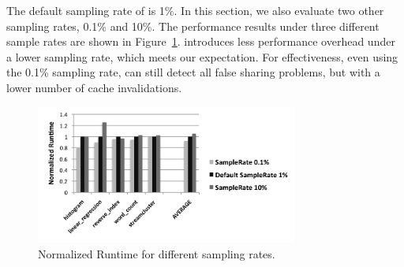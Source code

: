 The default sampling rate of \Predator{} is 1\%. In this section, we also evaluate two other sampling rates, 0.1\% and 10\%. The performance results under three different sample rates are shown in Figure~\ref{fig:sample}. \Predator{} introduces less performance overhead under a lower sampling rate, which meets our expectation. For effectiveness, even using the 0.1\% sampling rate, \Predator{} can still detect all false sharing problems, but with a lower number of cache invalidations. 
 
\begin{figure}
\begin{center} 
\includegraphics[width=3.4in]{fig/sample}
\end{center}
\caption{Normalized Runtime for different sampling rates.}
\label{fig:sample}
\end{figure}


